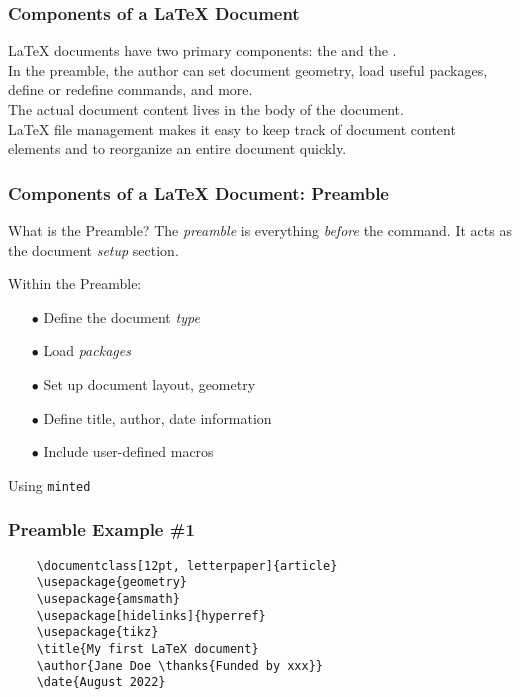 \begin{frame}[fragile]
\frametitle{Components of a \LaTeX{} Document}
    \LaTeX{} documents have two primary components: the  and the .\\[\baselineskip] \pause
    In the preamble, the author can set document geometry, load useful packages, define or redefine commands, and more. \\[\baselineskip] \pause
    The actual document content lives in the body of the document. \\[\baselineskip] \pause
    \LaTeX{} file management makes it easy to keep track of document content elements and to reorganize an entire document quickly.
\end{frame}


\begin{frame}[fragile] %
\frametitle{Components of a \LaTeX{} Document: Preamble}
\begin{block}{What is the Preamble?}
    The \emph{preamble} is everything \emph{before} the
    \verb||
    command. 
    It acts as the document \emph{setup} section.
\end{block} \pause
\begin{block}{Within the Preamble:} 
    \begin{itemize}
        \item[$\bullet$] Define the document \emph{type} \pause
        \item[$\bullet$] Load \textit{packages} \pause
        \item[$\bullet$] Set up document layout, geometry \pause
        \item[$\bullet$] Define title, author, date information \pause
        \item[$\bullet$] Include user-defined macros
    \end{itemize}
\end{block}
\end{frame}


    


\begin{frame}[fragile]{Using \texttt{minted}}
\frametitle{Preamble Example \#1}
\begin{verbatim} 
    \documentclass[12pt, letterpaper]{article}
    \usepackage{geometry}
    \usepackage{amsmath}
    \usepackage[hidelinks]{hyperref}
    \usepackage{tikz}
    \title{My first LaTeX document}
    \author{Jane Doe \thanks{Funded by xxx}}
    \date{August 2022}
    
\end{verbatim}
\end{frame}

